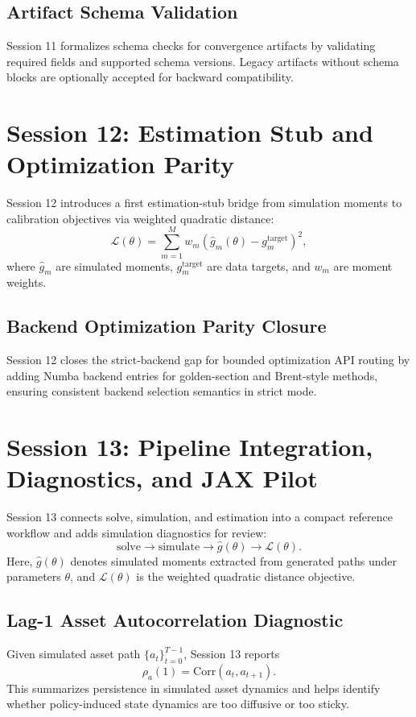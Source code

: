 \documentclass[11pt]{article}
\begin{document}
\subsection{Artifact Schema Validation}
Session 11 formalizes schema checks for convergence artifacts by validating
required fields and supported schema versions. Legacy artifacts without schema
blocks are optionally accepted for backward compatibility.

\section{Session 12: Estimation Stub and Optimization Parity}
Session 12 introduces a first estimation-stub bridge from simulation moments to
calibration objectives via weighted quadratic distance:
\begin{equation}
    \mathcal{L}(\theta) = \sum_{m=1}^{M} w_m\left(\hat{g}_m(\theta)-g_m^{\text{target}}\right)^2,
\end{equation}
where \(\hat{g}_m\) are simulated moments, \(g_m^{\text{target}}\) are data
targets, and \(w_m\) are moment weights.

\subsection{Backend Optimization Parity Closure}
Session 12 closes the strict-backend gap for bounded optimization API routing
by adding Numba backend entries for golden-section and Brent-style methods,
ensuring consistent backend selection semantics in strict mode.

\section{Session 13: Pipeline Integration, Diagnostics, and JAX Pilot}
Session 13 connects solve, simulation, and estimation into a compact reference
workflow and adds simulation diagnostics for review:
\begin{equation}
    \text{solve} \rightarrow \text{simulate} \rightarrow \hat{g}(\theta) \rightarrow
    \mathcal{L}(\theta).
\end{equation}
Here, \(\hat{g}(\theta)\) denotes simulated moments extracted from generated
paths under parameters \(\theta\), and \(\mathcal{L}(\theta)\) is the weighted
quadratic distance objective.

\subsection{Lag-1 Asset Autocorrelation Diagnostic}
Given simulated asset path \(\{a_t\}_{t=0}^{T-1}\), Session 13 reports
\begin{equation}
    \rho_a(1) = \mathrm{Corr}(a_t, a_{t+1}).
\end{equation}
This summarizes persistence in simulated asset dynamics and helps identify
whether policy-induced state dynamics are too diffusive or too sticky.
\end{document}

